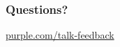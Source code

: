 \documentclass[t]{beamer}
\begin{document}
\begin{frame}
  \frametitle{}

\end{frame}

\begin{frame}
  \frametitle{}

\end{frame}

\begin{frame}
  \frametitle{}

\end{frame}

\begin{frame}
  \frametitle{}

\end{frame}

\begin{frame}
  \frametitle{Questions?}
  \vspace{3cm}
  \centerline{\large\url{purple.com/talk-feedback}}
\end{frame}
\end{document}
